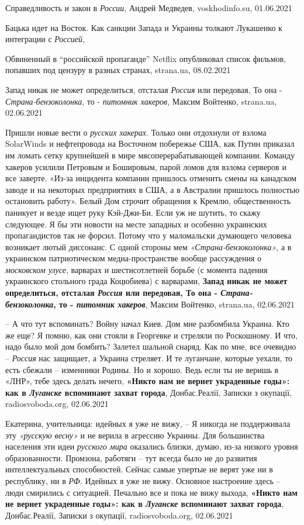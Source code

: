 Справедливость и закон в \emph{России}, Андрей Медведев, voskhodinfo.su, 01.06.2021

Бацька идет на Восток. Как санкции Запада и Украины толкают Лукашенко к интеграции с \emph{Россией},

Обвиненный в \enquote{российской пропаганде} Netflix опубликовал список фильмов, попавших под цензуру в разных странах,
strana.ua, 08.02.2021

Запад никак не может определиться, отсталая \emph{Россия} или передовая, То она - \emph{Страна-бензоколонка}, то - \emph{питомник хакеров},
Максим Войтенко, strana.ua, 02.06.2021

Пришли новые вести о \emph{русских хакерах}. Только они отдохнули от взлома
SolarWinds и нефтепровода на Восточном побережье США, как Путин приказал им
ломать сетку крупнейшей в мире мясоперерабатывающей компании. Команду хакеров
усилили Петровым и Бошировым, парой ломов для взлома серверов и все заверте.
«Из-за инцидента компании пришлось отменить смены на канадском заводе и на
некоторых предприятиях в США, а в Австралии пришлось полностью остановить
работу». Белый Дом строчит обращения к Кремлю, общественность паникует и везде
ищет руку Кэй-Джи-Би. Если уж не шутить, то скажу следующее. Я бы эти новости
на месте западных и особенно украинских пропагандистов так не форсил. Потому
что у маломальски думающего человека возникает лютый диссонанс. С одной стороны
мем \emph{«Страна-бензоколонка»}, а в украинском патриотическом
медиа-пространстве вообще рассуждения о \emph{московском улусе}, варварах и
шестисотлетней борьбе (с момента падения украинского стольного града Коцюбиева)
с варварами,
\textbf{Запад никак не может определиться, отсталая \emph{Россия} или передовая, То она - \emph{Страна-бензоколонка}, то - \emph{питомник хакеров}},
Максим Войтенко, strana.ua, 02.06.2021

– А что тут вспоминать? Войну начал Киев. Дом мне разбомбила Украина. Кто же
еще? Я помню, как они стояли в Георгевке и стреляли по Роскошному. И что, надо
было мой дом бомбить? Залетел шальной снаряд. Как по мне, все очевидно – \emph{Россия}
нас защищает, а Украина стреляет. И те луганчане, которые уехали, то есть
сбежали – изменники Родины. Но и хорошо. Ведь если ты не веришь в «ЛНР», тебе
здесь делать нечего,
\textbf{«Никто нам не вернет украденные годы»: как в \emph{Луганске} вспоминают захват города},
Донбас.Реалії, Записки з окупації, radiosvoboda.org, 02.06.2021

Екатерина, учительница: идейных я уже не вижу, – Я никогда не поддерживала эту
\emph{«русскую весну»} и не верила в агрессию Украины. Для большинства населения эти
идеи \emph{русского мира} оказались близки, думаю, из-за низкого уровня
образованности. Промзона, работяги – тут всегда было не до развития
интеллектуальных способностей. Сейчас самые упертые не верят уже ни в
республику, ни в \emph{РФ}. Идейных я уже не вижу. Основное настроение здесь – люди
смирились с ситуацией. Печально все и пока не вижу выхода,
\textbf{«Никто нам не вернет украденные годы»: как в \emph{Луганске} вспоминают захват города},
Донбас.Реалії, Записки з окупації, radiosvoboda.org, 02.06.2021

